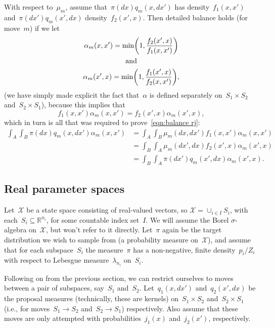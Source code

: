 \documentclass[11pt,a4paper]{article}
\newcommand\mb[1]{\mathbb{#1}}                   %
\newcommand\mc[1]{\mathcal{#1}}                  %
\DeclarePairedDelimiter\lr{\lparen}{\rparen}     %
\theoremstyle{definition}
\begin{document}
With respect to~$\mu_m$, assume that~$\pi(dx)q_m(x,dx')$ has density~$f_1(x,x')$
and~$\pi(dx')q_m(x',dx)$ density~$f_2(x',x)$. Then detailed balance holds (for
move~$m$) if we let
\begin{equation}\label{eqn:alpha rj}
\begin{gathered}
  \alpha_m(x,x') = \min\lr*{1,\frac{f_2(x',x)}{f_1(x,x')}} \\
  \text{and} \\
  \alpha_m(x',x) = \min\lr*{1,\frac{f_1(x',x)}{f_2(x,x')}},
\end{gathered}
\end{equation}
(we have simply made explicit the fact that~$\alpha$ is defined separately
on~$S_1\times S_2$ and~$S_2\times S_1$), because this implies that
\[ f_1(x,x')\alpha_m(x,x') = f_2(x',x)\alpha_m(x',x), \]
which in turn is all that was required to prove~\eqref{eqn:balance rj}:
\begin{align*}
  \int_A \int_B \pi(dx)q_m(x,dx')\alpha_m(x,x')
  &= \int_A \int_B \mu_m(dx,dx')f_1(x,x')\alpha_m(x,x') \\
  &= \int_B \int_A \mu_m(dx',dx)f_2(x',x)\alpha_m(x',x) \\
  &= \int_B \int_A \pi(dx')q_m(x',dx)\alpha_m(x',x).
\end{align*}

\subsection{Real parameter spaces} %
\label{sec:reals}

Let~$\mc{X}$ be a state space consisting of real-valued vectors, so $\mc{X} =
\cup_{i\in I} S_i$, with each~$S_i \subseteq \mb{R}^{n_i}$, for some countable
index set~$I$. We will assume the Borel $\sigma$-algebra on~$\mc{X}$, but won't
refer to it directly. Let~$\pi$ again be the target distribution we wish to
sample from (a probability measure on~$\mc{X}$), and assume that for each
subspace~$S_i$ the measure~$\pi$ has a non-negative, finite density~$p_i/Z_i$
with respect to Lebesgue measure~$\lambda_{n_i}$ on~$S_i$.

Following on from the previous section, we can restrict ourselves to moves
between a pair of subspaces, say~$S_1$ and~$S_2$. Let~$q_1(x,dx')$
and~$q_2(x',dx)$ be the proposal measures (technically, these are kernels)
on~$S_1 \times S_2$ and~$S_2 \times S_1$ (i.e., for moves~$S_1 \to S_2$ and~$S_2
\to S_1$) respectively. Also assume that these moves are only attempted with
probabilities~$j_1(x)$ and~$j_2(x')$, respectively.
\end{document}
